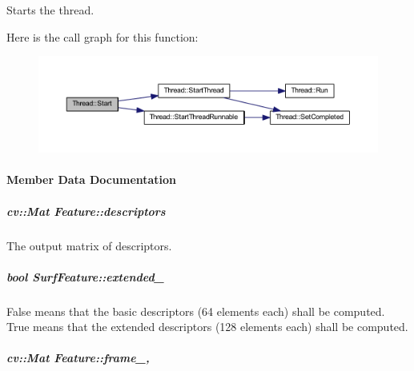 Starts the thread. 



Here is the call graph for this function\-:
\nopagebreak
\begin{figure}[H]
\begin{center}
\leavevmode
\includegraphics[width=350pt]{group___core_a2b42f82341afd2747ea093b6ac8b91cb_cgraph}
\end{center}
\end{figure}




\paragraph{Member Data Documentation}
\hypertarget{group___feature_extractor_a857c4955b0325d8b96c863d873bf8db5}{
\subparagraph[{descriptors}]{\setlength{\rightskip}{0pt plus 5cm}cv\-::\-Mat Feature\-::descriptors\hspace{0.3cm}{\ttfamily [inherited]}}}\label{group___feature_extractor_a857c4955b0325d8b96c863d873bf8db5}


The output matrix of descriptors. 

\hypertarget{group___feature_extractor_a89c68527db49e286206062375b09c7bd}{
\subparagraph[{extended\-\_\-}]{\setlength{\rightskip}{0pt plus 5cm}bool Surf\-Feature\-::extended\-\_\-\hspace{0.3cm}{\ttfamily [private]}}}\label{group___feature_extractor_a89c68527db49e286206062375b09c7bd}


False means that the basic descriptors (64 elements each) shall be computed. True means that the extended descriptors (128 elements each) shall be computed. 

\hypertarget{group___feature_extractor_aa805e6fee8eeec2061feabe29430f0df}{
\subparagraph[{frame\-\_\-}]{\setlength{\rightskip}{0pt plus 5cm}cv\-::\-Mat Feature\-::frame\-\_\-\hspace{0.3cm}{\ttfamily [protected]}, {\ttfamily [inherited]}}}\label{group___feature_extractor_aa805e6fee8eeec2061feabe29430f0df}


